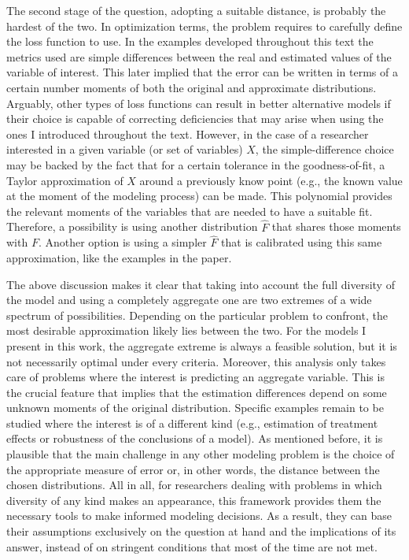 \documentclass[english, a4paper, 12pt]{article}
\begin{document}
The second stage of the question, adopting a suitable distance, is probably the hardest of the two. In optimization terms, the problem requires to carefully define the loss function to use. In the examples developed throughout this text the metrics used are simple differences between the real and estimated values of the variable of interest. This later implied that the error can be written in terms of a certain number moments of both the original and approximate distributions. Arguably, other types of loss functions can result in better alternative models if their choice is capable of correcting deficiencies that may arise when using the ones I introduced throughout the text. However, in the case of a researcher interested in a given variable (or set of variables) $X$, the simple-difference choice may be backed by the fact that for a certain tolerance in the goodness-of-fit, a Taylor approximation of $X$ around a previously know point (e.g., the known value at the moment of the modeling process) can be made. This polynomial provides the relevant moments of the variables that are needed to have a suitable fit. Therefore, a possibility is using another distribution $\hat{F}$ that shares those moments with $F$. Another option is using a simpler $\hat{F}$ that is calibrated using this same approximation, like the examples in the paper.

The above discussion makes it clear that taking into account the full diversity of the model and using a completely aggregate one are two extremes of a wide spectrum of possibilities. Depending on the particular problem to confront, the most desirable approximation likely lies between the two. For the models I present in this work, the aggregate extreme is always a feasible solution, but it is not necessarily optimal under every criteria. Moreover, this analysis only takes care of problems where the interest is predicting an aggregate variable. This is the crucial feature that implies that the estimation differences depend on some unknown moments of the original distribution. Specific examples remain to be studied where the interest is of a different kind (e.g., estimation of treatment effects or robustness of the conclusions of a model). As mentioned before, it is plausible that the main challenge in any other modeling problem is the choice of the appropriate measure of error or, in other words, the distance between the chosen distributions. All in all, for researchers dealing with problems in which diversity of any kind makes an appearance, this framework provides them the necessary tools to make informed modeling decisions. As a result, they can base their assumptions exclusively on the question at hand and the implications of its answer, instead of on stringent conditions that most of the time are not met.
\end{document}
